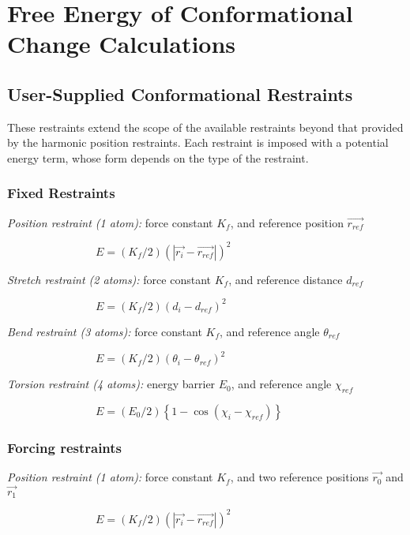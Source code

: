 
\section{Free Energy of Conformational Change Calculations}

\subsection{User-Supplied Conformational Restraints}

These restraints extend the scope of the available restraints beyond that
provided by the harmonic position restraints. Each restraint is imposed with
a potential energy term, whose form depends on the type of the
restraint.\medskip

\subsubsection{Fixed Restraints}

{\em Position restraint (1 atom):} force constant $K_{f}$, and reference
position $\overrightarrow{r_{ref}}$

$\qquad \qquad \qquad \qquad E=\left( K_{f}/2\right) \left( \left| 
\overrightarrow{r_{i}}-\overrightarrow{r_{ref}}\right| \right) ^{2}$

{\em Stretch restraint (2 atoms):} force constant $K_{f}$, and reference
distance $d_{ref}$

$\qquad \qquad \qquad \qquad E=\left( K_{f}/2\right) \left(
d_{i}-d_{ref}\right) ^{2}$

{\em Bend restraint (3 atoms):} force constant $K_{f}$, and reference angle $%
\theta _{ref}$

$\qquad \qquad \qquad \qquad E=\left( K_{f}/2\right) \left( \theta
_{i}-\theta _{ref}\right) ^{2}$

{\em Torsion restraint (4 atoms):} energy barrier $E_{0}$, and reference
angle $\chi _{ref}$

$\qquad \qquad \qquad \qquad E=\left( E_{0}/2\right) \left\{ 1-\cos \left(
\chi _{i}-\chi _{ref}\right) \right\} $

\subsubsection{Forcing restraints}

{\em Position restraint (1 atom):} force constant $K_{f}$, and two reference
positions $\overrightarrow{r_{0}}$ and $\overrightarrow{r_{1}}$

$\qquad \qquad \qquad \qquad E=\left( K_{f}/2\right) \left( \left| 
\overrightarrow{r_{i}}-\overrightarrow{r_{ref}}\right| \right) ^{2}$

